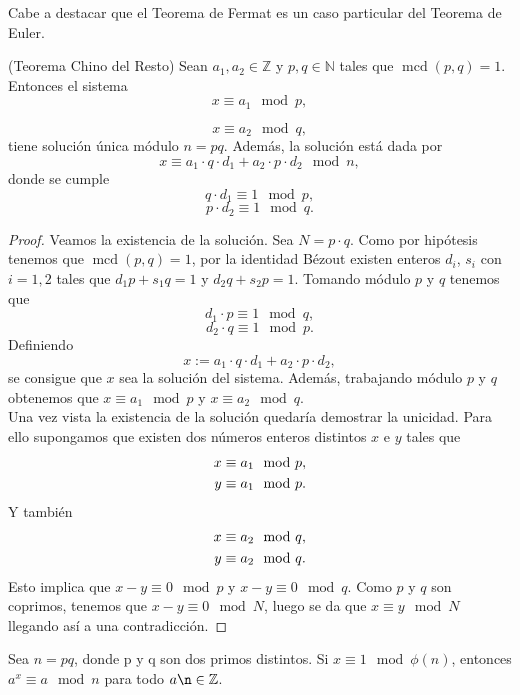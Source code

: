 Cabe a destacar que el Teorema de Fermat es un caso particular del Teorema de Euler.\\

\begin{teorema}
		(Teorema Chino del Resto) Sean $a_1, a_2\in \mathbb{Z}$ y $p,q \in \mathbb{N}$ tales que $\operatorname{mcd}(p,q) = 1$. Entonces el sistema
		$$
			x\equiv a_1 \mod p,
		$$\vspace*{-11mm}

		$$
			x\equiv a_2 \mod q,
		$$
	tiene solución única módulo $n=pq$. Además, la solución está dada por
	$$
		x\equiv a_1\cdot q\cdot d_1 +a_2\cdot p\cdot d_2 \mod n,
	$$
	donde se cumple
	$$
		q\cdot d_1 \equiv 1 \mod p,
	$$
	$$
		p\cdot d_2 \equiv 1 \mod q.
	$$
\end{teorema}
\begin{proof}
		Veamos la existencia de la solución. Sea $N=p\cdot q$. Como por hipótesis tenemos que $\operatorname{mcd}(p,q)=1$, por la identidad Bézout existen enteros $d_i$, $s_i$ con $i=1,2$ tales que $d_1p+s_1q=1$ y $d_2q+s_2p=1$. Tomando módulo $p$ y $q$ tenemos que 
	$$
		d_1\cdot p \equiv 1 \mod q,
	$$
	$$
		d_2\cdot q \equiv 1 \mod p.
	$$
	Definiendo 
	$$
		x :=  a_1\cdot q\cdot d_1 +a_2\cdot p\cdot d_2,
	$$
	se consigue que $x$ sea la solución del sistema. Además, trabajando módulo $p$ y $q$ obtenemos que $x\equiv a_1 \mod p$ y $x\equiv a_2 \mod q$.\\
	Una vez vista la existencia de la solución quedaría demostrar la unicidad. Para ello supongamos que existen dos números enteros distintos $x$ e $y$ tales que 
		\begin{equation}
			\begin{split}
				x \equiv a_1 \mod p,\notag\\
				y \equiv a_1 \mod p.\notag
			\end{split}
		\end{equation}
	Y también 
		\begin{equation}
			\begin{split}
				x \equiv a_2 \mod q,\notag\\
				y \equiv a_2 \mod q.\notag
			\end{split}
		\end{equation}
	Esto implica que $x-y\equiv0 \mod p$ y $x-y\equiv0 \mod q$. Como $p$ y $q$ son coprimos, tenemos que $x-y\equiv 0 \mod N$, luego se da que $x\equiv y \mod N$ llegando así a una contradicción. \qedhere
\end{proof}

\begin{proposicion}
	Sea $n = pq$, donde p y q son dos primos distintos. Si $x\equiv 1 \mod \phi(n)$, entonces $a^x\equiv a\mod n$ para todo $ a \n \in \mathbb{Z}$.
\end{proposicion}\vspace*{-5mm}

